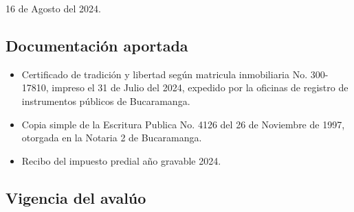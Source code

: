 \documentclass[12pt,a4paper,twoside]{article}
\begin{document}
{16 de Agosto del 2024.

\subsection{Documentación aportada}

\begin{itemize}
\item Certificado de tradición y libertad según matricula inmobiliaria No. 300-17810, impreso el 31 de Julio del 2024, expedido por la oficinas de registro de instrumentos públicos de Bucaramanga.
\item Copia simple de la Escritura Publica No. 4126 del 26 de Noviembre de 1997, otorgada en la Notaria 2 de Bucaramanga.
\item Recibo del impuesto predial año gravable 2024.

\end{itemize}



\subsection{Vigencia del avalúo}

}
\end{document}
